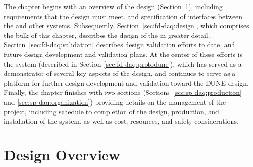 The chapter begins with an overview of the  design (Section~\ref{sec:fd-daq:overview}),
including requirements that the design must meet, and specification of
interfaces between the   and other   systems. 
Subsequently, Section~\ref{sec:fd-daq:design}, which comprises the
bulk of this chapter, describes the design of the 
 in greater detail.
Section~\ref{sec:fd-daq:validation} describes design validation efforts
to date, and future design development and validation plans. At the
center of these efforts is the 
  system (described in Section~\ref{sec:fd-daq:protodune}), which has served as a demonstrator of several
key aspects of the      design, and continues to serve as a
platform for further design development and validation toward the
DUNE  design. 
Finally, the chapter finishes with two sections
(Sections~\ref{sec:sp-daq:production} and \ref{sec:sp-daq:organization}) providing details on
the management of the
 project, including schedule to completion of the design, 
production, and installation of the system, as well as cost, resources, and
safety considerations.

\section{Design Overview}
\label{sec:fd-daq:overview}

